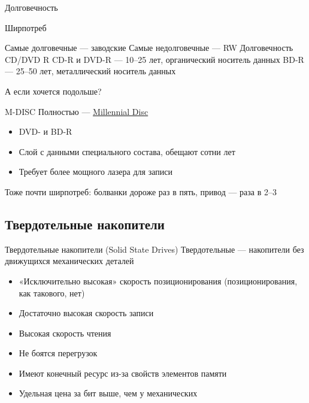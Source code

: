 \documentclass[xetex,aspectratio=43]{beamer}
\begin{document}
\begin{frame}{Долговечность}
    \begin{block}{Ширпотреб}
        \begin{outline}
            \1 Самые долговечные --- заводские
            \1 Самые недолговечные --- RW
            \1 Долговечность CD/DVD R
                \2 CD-R и DVD-R --- 10--25 лет, органический носитель данных
                \2 BD-R --- 25--50 лет, металлический носитель данных
        \end{outline}
    \end{block}
    \pause
    А если хочется подольше?
    \pause
    \begin{block}{M-DISC}
        Полностью --- \href{https://ru.wikipedia.org/wiki/M-DISC}{Millennial Disc}
        \begin{itemize}
            \item DVD- и BD-R
            \item Слой с данными специального состава, обещают сотни лет
            \item Требует более мощного лазера для записи
        \end{itemize}
        Тоже почти ширпотреб: болванки дороже раз в пять, привод --- раза в 2--3
    \end{block}
\end{frame}

\subsection{Твердотельные накопители}

\begin{frame}{Твердотельные накопители (Solid State Drives)}
    Твердотельные --- накопители без движущихся механических деталей

    \begin{itemize}
        \tightlist
        \item
        «Исключительно высокая» скорость позиционирования (позиционирования,
        как такового, нет)
        \item
        Достаточно высокая скорость записи
        \item
        Высокая скорость чтения
    \end{itemize}

    \pause

    \begin{itemize}
        \tightlist
        \item
        Не боятся перегрузок
        \item
        Имеют конечный ресурс из-за свойств элементов памяти
        \item
        Удельная цена за бит выше, чем у механических
    \end{itemize}

\end{frame}
\end{document}
